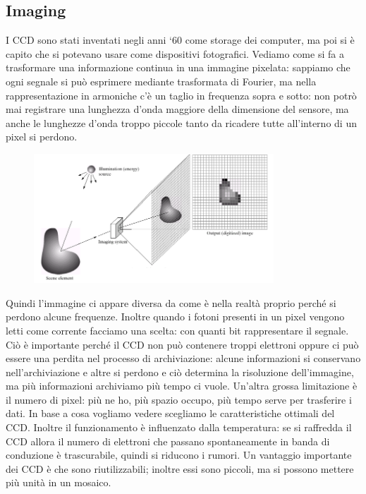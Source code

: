 \documentclass[a4paper,11pt]{article}
\begin{document}
\subsection{Imaging}
 I CCD sono stati inventati negli anni ‘60 come storage dei computer, ma poi si è capito che si potevano usare come dispositivi fotografici. Vediamo come si fa a trasformare una informazione continua in una immagine pixelata: sappiamo che ogni segnale si può esprimere mediante trasformata di Fourier, ma nella rappresentazione in armoniche c’è un taglio in frequenza sopra e sotto: non potrò mai registrare una lunghezza d’onda maggiore della dimensione del sensore, ma anche le lunghezze d’onda troppo piccole tanto da ricadere tutte all’interno di un pixel si perdono.
 \newline
\begin{figure}[h!!]
        \centering
        \includegraphics[width=9cm]{astro6.png}
        \label{}
    \end{figure}
\newline
Quindi l’immagine ci appare diversa da come è nella realtà proprio perché si perdono alcune frequenze. Inoltre quando i fotoni presenti in un pixel vengono letti come corrente facciamo una scelta: con quanti bit rappresentare il segnale. Ciò è importante perché il CCD non può contenere troppi elettroni oppure ci può essere una perdita nel processo di archiviazione: alcune informazioni si conservano nell’archiviazione e altre si perdono e ciò determina la risoluzione dell'immagine, ma più informazioni archiviamo più tempo ci vuole. Un’altra grossa limitazione è il numero di pixel: più ne ho, più spazio occupo, più tempo serve per trasferire i dati. In base a cosa vogliamo vedere scegliamo le caratteristiche ottimali del CCD. 
\newline
Inoltre il funzionamento è influenzato dalla temperatura: se si raffredda il CCD allora il numero di elettroni che passano spontaneamente in banda di conduzione è trascurabile, quindi si riducono i rumori. Un vantaggio importante dei CCD è che sono riutilizzabili; inoltre essi sono piccoli, ma si possono mettere più unità in un mosaico.
\end{document}
